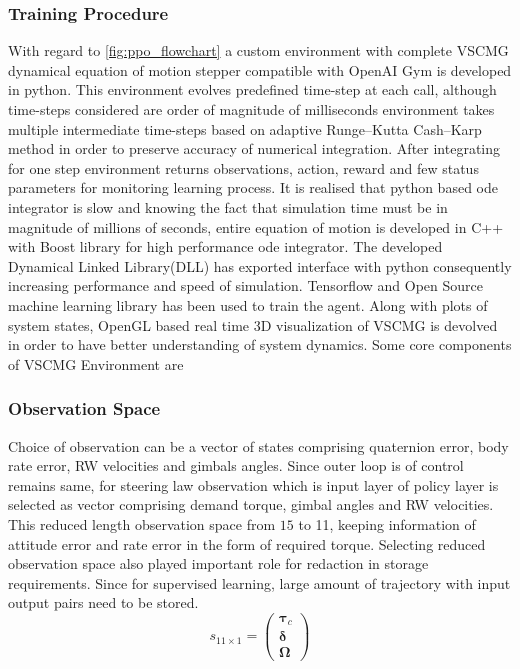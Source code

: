 \subsubsection{Training Procedure}
With regard to \autoref{fig:ppo_flowchart} a custom environment with complete VSCMG dynamical equation of motion stepper compatible with OpenAI Gym \cite{OpenAIGym} is developed in python. This environment evolves predefined time-step at each call, although time-steps considered are order of magnitude of milliseconds environment takes multiple intermediate time-steps based on adaptive  Runge–Kutta Cash–Karp method in order to preserve accuracy of numerical integration. After integrating for one step environment returns observations, action, reward and few status parameters for monitoring learning process. It is realised that python based  \acrfull{ode} integrator is slow and knowing the fact that simulation time must be in magnitude of millions of seconds, entire equation of motion is developed in C++ with Boost library \cite{abrahams2003building} for high performance \acrshort{ode} integrator. The developed Dynamical Linked Library(DLL) has exported interface with python consequently increasing performance and speed of simulation. Tensorflow and Open Source machine learning library has been used to train the agent. Along with plots of system states, OpenGL based real time 3D visualization of VSCMG is devolved in order to have better understanding of system dynamics. Some core components of VSCMG Environment are 
\subsubsection{Observation Space}
Choice of observation can be a vector of states comprising quaternion error, body rate error, RW velocities and gimbals angles. Since outer loop is of control remains same, for steering law observation which is input layer of policy layer is selected as vector comprising demand torque, gimbal angles and RW velocities. This reduced length observation space from $\displaystyle 15$ to 11, keeping information of attitude error and rate error in the form of required torque. Selecting reduced observation space also played important role for redaction in storage requirements. Since for supervised learning, large amount of trajectory with input output pairs need to be stored.
\begin{equation}
s_{11\times 1} =\begin{pmatrix}
\mathbf{\tau }_{c}\\
\mathbf{{\delta }}\\
\mathbf{{\Omega }}
\end{pmatrix}
\end{equation}
